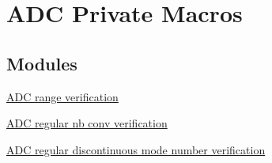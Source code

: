 \hypertarget{group___a_d_c___private___macros}{}\section{A\+DC Private Macros}
\label{group___a_d_c___private___macros}
\subsection*{Modules}
\begin{DoxyCompactItemize}
\item 
\hyperlink{group___a_d_c__range__verification}{A\+D\+C range verification}
\item 
\hyperlink{group___a_d_c__regular__nb__conv__verification}{A\+D\+C regular nb conv verification}
\item 
\hyperlink{group___a_d_c__regular__discontinuous__mode__number__verification}{A\+D\+C regular discontinuous mode number verification}
\end{DoxyCompactItemize}
